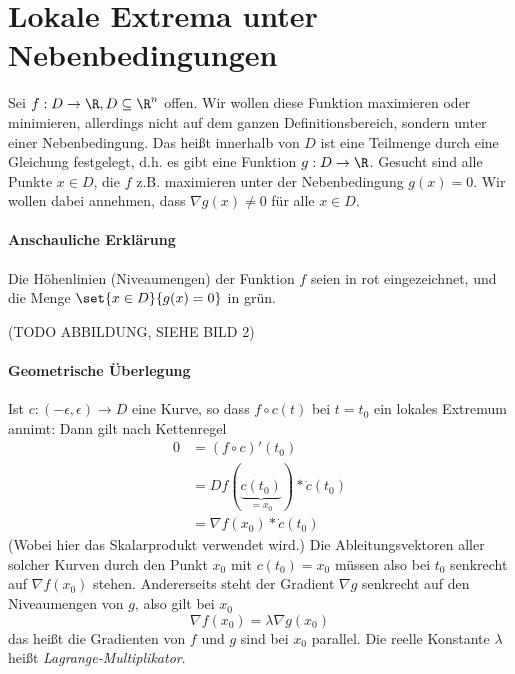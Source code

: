 \section{Lokale Extrema unter Nebenbedingungen}
Sei $f:D\rightarrow \R, D\subseteq \R^n$ offen. Wir wollen diese Funktion maximieren oder minimieren, allerdings nicht auf dem ganzen Definitionsbereich, sondern unter einer Nebenbedingung. Das heißt innerhalb von $D$ ist eine Teilmenge durch eine Gleichung festgelegt, d.h. es gibt eine Funktion $g:D\rightarrow \R$. Gesucht sind alle Punkte $x\in D$, die $f$ z.B. maximieren unter der Nebenbedingung $g(x)=0$. Wir wollen dabei annehmen, dass $\nabla g(x)\neq 0$ für alle $x\in D$.
\paragraph{Anschauliche Erklärung}
Die Höhenlinien (Niveaumengen) der Funktion $f$ seien in rot eingezeichnet, und die Menge $\set{x\in D}{g(x)=0}$ in grün.

(TODO ABBILDUNG, SIEHE BILD 2)

\paragraph{Geometrische Überlegung}
Ist $c:(-\epsilon,\epsilon)\rightarrow D$ eine Kurve, so dass $f\circ c(t)$ bei $t=t_0$ ein lokales Extremum annimt: Dann gilt nach Kettenregel
\begin{align*}
	0&=\left(f\circ c\right)'(t_0)\\
	&=Df(\underbrace{c(t_0)}_{=x_0}) *\dot c(t_0)\\
	&=\nabla f(x_0)*\dot c(t_0)
\end{align*}
(Wobei hier das Skalarprodukt verwendet wird.)
Die Ableitungsvektoren aller solcher Kurven durch den Punkt $x_0$ mit $c(t_0)=x_0$ müssen also bei $t_0$ senkrecht auf $\nabla f(x_0)$ stehen. Andererseits steht der Gradient $\nabla g$ senkrecht auf den Niveaumengen von $g$, also gilt bei $x_0$
\begin{equation*}
	\nabla f(x_0)=\lambda \nabla g(x_0)
\end{equation*}
das heißt die Gradienten von $f$ und $g$ sind bei $x_0$ parallel. Die reelle Konstante $\lambda$ heißt \emph{Lagrange-Multiplikator}.

